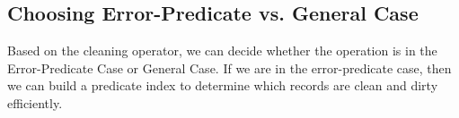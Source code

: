 
\subsection{Choosing Error-Predicate vs. General Case}
Based on the cleaning operator, we can decide whether the operation is in the Error-Predicate Case or General Case.
If we are in the error-predicate case, then we can build a predicate index to determine which records are clean and dirty efficiently. 
